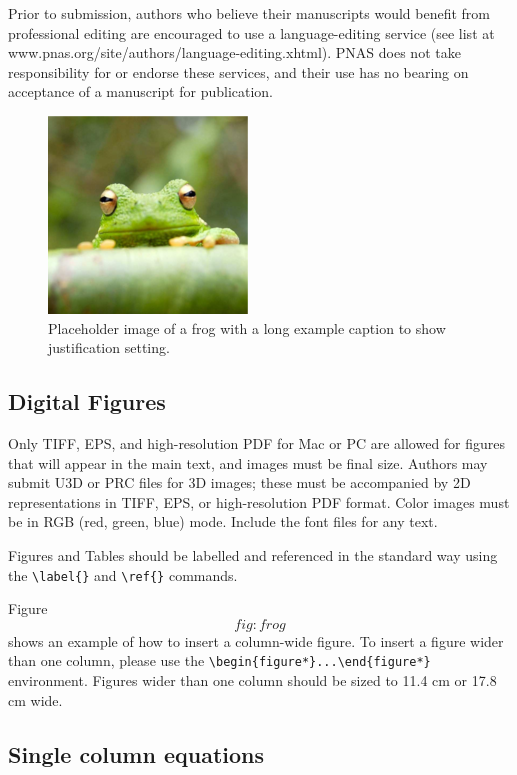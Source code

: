 \documentclass[9pt,twocolumn,twoside,]{pnas-new}
\begin{document}
Prior to submission, authors who believe their manuscripts would benefit
from professional editing are encouraged to use a language-editing
service (see list at www.pnas.org/site/authors/language-editing.xhtml).
PNAS does not take responsibility for or endorse these services, and
their use has no bearing on acceptance of a manuscript for publication.

\begin{figure}
\centering
\includegraphics{frog.png}
\caption{Placeholder image of a frog with a long example caption to show
justification setting.{}}
\end{figure}

\hypertarget{sec:figures}{%
\subsection*{Digital Figures}\label{sec:figures}}

Only TIFF, EPS, and high-resolution PDF for Mac or PC are allowed for
figures that will appear in the main text, and images must be final
size. Authors may submit U3D or PRC files for 3D images; these must be
accompanied by 2D representations in TIFF, EPS, or high-resolution PDF
format. Color images must be in RGB (red, green, blue) mode. Include the
font files for any text.

Figures and Tables should be labelled and referenced in the standard way
using the \texttt{\textbackslash{}label\{\}} and
\texttt{\textbackslash{}ref\{\}} commands.

Figure \[fig:frog\] shows an example of how to insert a column-wide
figure. To insert a figure wider than one column, please use the
\texttt{\textbackslash{}begin\{figure*\}...\textbackslash{}end\{figure*\}}
environment. Figures wider than one column should be sized to 11.4 cm or
17.8 cm wide.

\hypertarget{single-column-equations}{%
\subsection*{Single column equations}\label{single-column-equations}}
\end{document}
